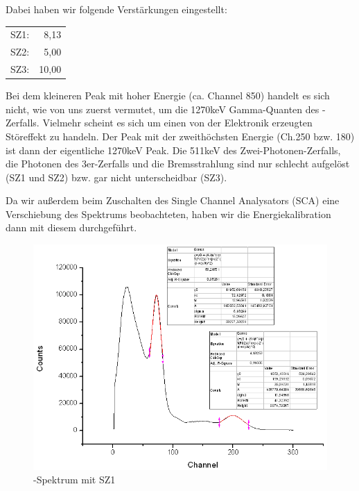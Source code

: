 Dabei haben wir folgende Verstärkungen eingestellt:

\begin{tabular}{lr}
SZ1:& 8,13\\
SZ2:& 5,00\\
SZ3:& 10,00
\end{tabular}


Bei dem kleineren Peak mit hoher Energie (ca. Channel 850) handelt es sich nicht, wie von uns zuerst vermutet, um die 1270keV Gamma-Quanten des \Na-Zerfalls. Vielmehr scheint es sich um einen von der Elektronik erzeugten Störeffekt zu handeln. Der Peak mit der zweithöchsten Energie (Ch.250 bzw. 180) ist dann der eigentliche 1270keV Peak. Die 511keV des Zwei-Photonen-Zerfalls, die Photonen des 3er-Zerfalls und die Bremsstrahlung sind nur schlecht aufgelöst (SZ1 und SZ2) bzw. gar nicht unterscheidbar (SZ3).

Da wir außerdem beim Zuschalten des Single Channel Analysators (SCA) eine Verschiebung des Spektrums beobachteten, haben wir die Energiekalibration dann mit diesem durchgeführt.
\begin{figure}
 \includegraphics[height=0.3\textheight]{Graphen/SZ1.png}
 \caption{\Na-Spektrum mit SZ1}
\end{figure}

